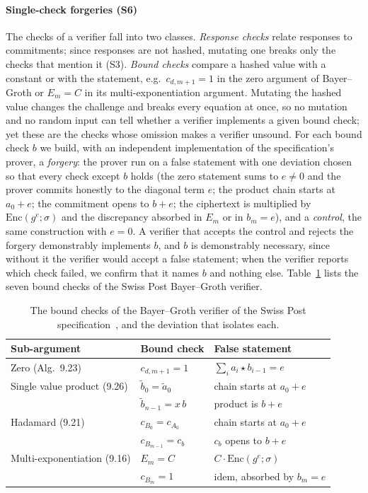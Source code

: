 \paragraph{Single-check forgeries (S6)}
The checks of a verifier fall into two classes. \emph{Response checks}
relate responses to commitments; since responses are not hashed, mutating
one breaks only the checks that mention it (S3). \emph{Bound checks}
compare a hashed value with a constant or with the statement, e.g.\
$c_{d,m+1} = 1$ in the zero argument of Bayer--Groth or $E_m = C$ in its
multi-exponentiation argument. Mutating the hashed value changes the
challenge and breaks every equation at once, so no mutation and no random
input can tell whether a verifier implements a given bound check; yet
these are the checks whose omission makes a verifier unsound. For each
bound check $b$ we build, with an independent implementation of the
specification's prover, a \emph{forgery}: the prover run on a false
statement with one deviation chosen so that every check except $b$ holds
(the zero statement sums to $e \ne 0$ and the prover commits honestly to
the diagonal term $e$; the product chain starts at $a_0 + e$; the
commitment opens to $b + e$; the ciphertext is multiplied by
$\mathrm{Enc}(g^e;\sigma)$ and the discrepancy absorbed in $E_m$ or in
$b_m = e$), and a \emph{control}, the same construction with $e = 0$. A
verifier that accepts the control and rejects the forgery demonstrably
implements $b$, and $b$ is demonstrably necessary, since without it the
verifier would accept a false statement; when the verifier reports which
check failed, we confirm that it names $b$ and nothing else.
Table~\ref{tab:bgchecks} lists the seven bound checks of the Swiss Post
Bayer--Groth verifier.

\begin{table}[t]
  \caption{The bound checks of the Bayer--Groth verifier of the Swiss Post
  specification~\cite{swisspost_cryptoprimitives_spec}, and the deviation
  that isolates each.}
  \label{tab:bgchecks}
  \centering\footnotesize\setlength{\tabcolsep}{4pt}
  \begin{tabular}{@{}lll@{}}
    \toprule
    Sub-argument & Bound check & False statement \\
    \midrule
    Zero (Alg.~9.23) & $c_{d,m+1}=1$ & $\sum_i a_i\star b_{i-1}=e$ \\
    Single value product (9.26) & $\tilde b_0=\tilde a_0$ & chain starts at $a_0+e$ \\
     & $\tilde b_{n-1}=x\,b$ & product is $b+e$ \\
    Hadamard (9.21) & $c_{B_0}=c_{A_0}$ & chain starts at $a_0+e$ \\
     & $c_{B_{m-1}}=c_b$ & $c_b$ opens to $b+e$ \\
    Multi-exponentiation (9.16) & $E_m=C$ & $C\cdot\mathrm{Enc}(g^{e};\sigma)$ \\
     & $c_{B_m}=1$ & idem, absorbed by $b_m=e$ \\
    \bottomrule
  \end{tabular}
\end{table}


